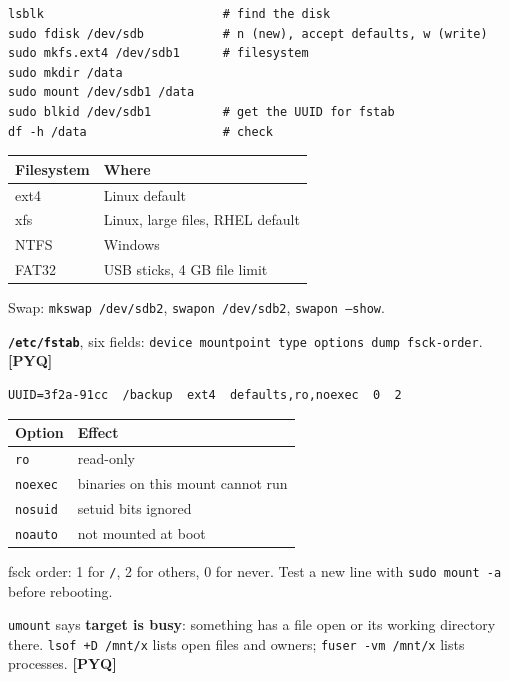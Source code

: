 \documentclass[11pt,a4paper]{article}
\newcommand{\pyq}{\textcolor{ember}{\scriptsize\textbf{[PYQ]}}}
\begin{document}
\begin{lstlisting}
lsblk                         # find the disk
sudo fdisk /dev/sdb           # n (new), accept defaults, w (write)
sudo mkfs.ext4 /dev/sdb1      # filesystem
sudo mkdir /data
sudo mount /dev/sdb1 /data
sudo blkid /dev/sdb1          # get the UUID for fstab
df -h /data                   # check
\end{lstlisting}
\begin{center}\small\renewcommand{\arraystretch}{1.18}\setlength{\tabcolsep}{9pt}
\begin{tabularx}{\linewidth}{@{}l>{\raggedright\arraybackslash}X@{}}
\toprule
\textbf{\color{slate}Filesystem} & \textbf{\color{slate}Where} \\ \midrule
ext4 & Linux default \\
xfs & Linux, large files, RHEL default \\
NTFS & Windows \\
FAT32 & USB sticks, 4 GB file limit \\
\bottomrule
\end{tabularx}\end{center}
Swap: \texttt{mkswap /dev/sdb2}, \texttt{swapon /dev/sdb2}, \texttt{swapon --show}.

\textbf{\texttt{/etc/fstab}}, six fields: \texttt{device mountpoint type options dump fsck-order}. \pyq{}

\begin{lstlisting}
UUID=3f2a-91cc  /backup  ext4  defaults,ro,noexec  0  2
\end{lstlisting}
\begin{center}\small\renewcommand{\arraystretch}{1.18}\setlength{\tabcolsep}{9pt}
\begin{tabularx}{\linewidth}{@{}l>{\raggedright\arraybackslash}X@{}}
\toprule
\textbf{\color{slate}Option} & \textbf{\color{slate}Effect} \\ \midrule
\texttt{ro} & read-only \\
\texttt{noexec} & binaries on this mount cannot run \\
\texttt{nosuid} & setuid bits ignored \\
\texttt{noauto} & not mounted at boot \\
\bottomrule
\end{tabularx}\end{center}
fsck order: 1 for \texttt{/}, 2 for others, 0 for never. Test a new line with \texttt{sudo mount -a} before rebooting.

\texttt{umount} says \textbf{target is busy}: something has a file open or its working directory there. \texttt{lsof +D /mnt/x} lists open files and owners; \texttt{fuser -vm /mnt/x} lists processes. \pyq{}
\end{document}
